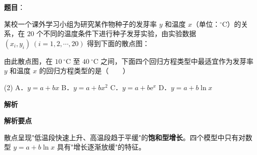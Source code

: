 \begin{answer}

\textbf{题目}：

某校一个课外学习小组为研究某作物种子的发芽率 $y$ 和温度 $x$（单位：$^\circ\mathrm C$）的关系，在 $20$ 个不同的温度条件下进行种子发芽实验，由实验数据 $\left(x_i,y_i\right)\ (i=1,2,\cdots,20)$ 得到下面的散点图：
\nopagebreak[4]
\begin{center}\end{center}
\nopagebreak[4]
由此散点图，在 $10\ ^\circ\mathrm C$ 至 $40\ ^\circ\mathrm C$ 之间，下面四个回归方程类型中最适宜作为发芽率 $y$ 和温度 $x$ 的回归方程类型的是\mbox{（　　）}

\begin{gkopts}(2)
\task A．$y=a+bx$
\task B．$y=a+bx^{2}$
\task C．$y=a+b\mathrm e^{x}$
\task D．$y=a+b\ln x$
\end{gkopts}

\textbf{解析}

\textbf{解析要点}

散点呈现"低温段快速上升、高温段趋于平缓"的\textbf{饱和型增长}。四个模型中只有对数型 $y=a+b\ln x$ 具有"增长逐渐放缓"的特征。


\par\medskip

\end{answer}
